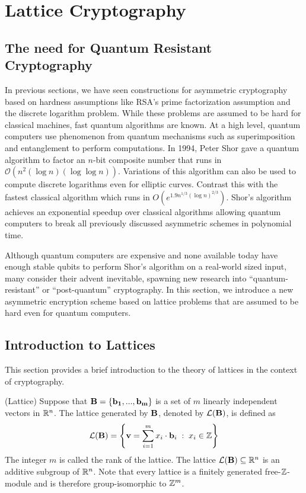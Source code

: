 \section{Lattice Cryptography}


\subsection{The need for Quantum Resistant Cryptography}
In previous sections, we have seen constructions for asymmetric cryptography based on hardness assumptions like RSA's prime factorization assumption and the discrete logarithm problem. While these problems are assumed to be hard for classical machines, fast quantum algorithms are known. At a high level, quantum computers use phenomenon from quantum mechanisms such as superimposition and entanglement to perform computations. 
In 1994, Peter Shor gave a quantum algorithm \cite{Shor1994} to factor an $n$-bit composite number that runs in $\mathcal{O}\left( n^2(\log n) (\log \log n)\right)$. Variations of this algorithm can also be used to compute discrete logarithms even for elliptic curves. Contrast this with the fastest classical algorithm which runs in $O(e^{1.9 n^{1/3} (\log n)^{2/3}})$. Shor's algorithm achieves an exponential speedup over classical algorithms allowing quantum computers to break all previously discussed asymmetric schemes in polynomial time. 

Although quantum computers are expensive and none available today have enough stable qubits to perform Shor's algorithm on a real-world sized input, many consider their advent inevitable, spawning new research into ``quantum-resistant'' or ``post-quantum'' cryptography. In this section, we introduce a new asymmetric encryption scheme based on lattice problems that are assumed to be hard even for quantum computers.

\subsection{Introduction to Lattices}
This section provides a brief introduction to the theory of lattices in the context of cryptography.
\begin{definition}
(Lattice)
Suppose that $\mathbf{B} = \{\mathbf{b_1},...,\mathbf{b_m}\}$ is a set of $m$ linearly independent vectors in $\mathbb{R}^n$. The lattice generated by $\mathbf{B}$, denoted by $\mathcal{L}(\mathbf{B})$, is defined as
\[
\mathcal{L}(\mathbf{B}) = \left\{ \mathbf{v} = \sum_{i=1}^m x_i \cdot \mathbf{b}_i \; : \; x_i \in {{\mathbb Z}} \right\}
\]
The integer $m$ is called the rank of the lattice. The lattice $\mathcal{L}(\mathbf{B}) \subseteq \mathbb{R}^n$ is an additive subgroup of $\mathbb{R}^n$. Note that every lattice is a finitely generated free-${{\mathbb Z}}$-module and is therefore group-isomorphic to ${{\mathbb Z}}^m$.
\end{definition}

